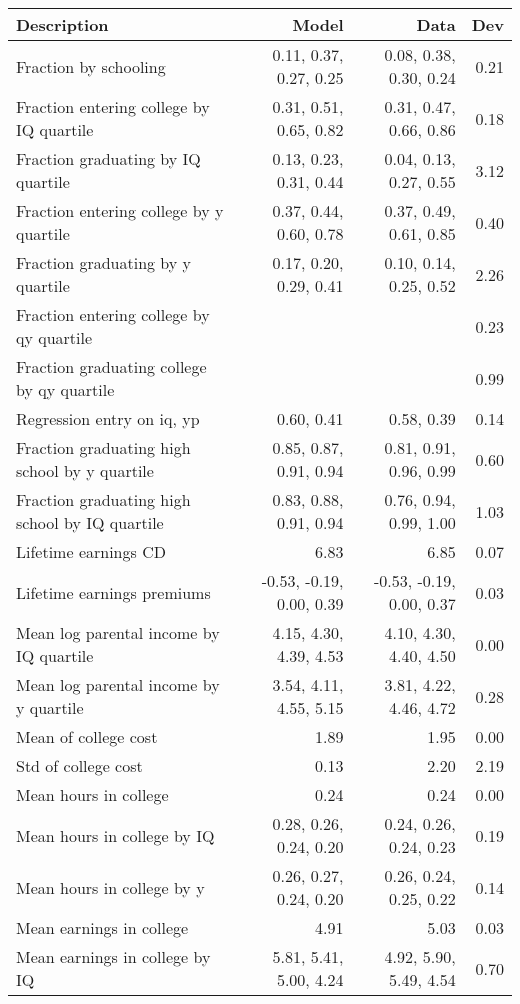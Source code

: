 \begin{tabular}{lrrr}
\hline
Description & Model  & Data  & Dev  \\ 
\hline
Fraction by schooling & 0.11, 0.37, 0.27, 0.25  & 0.08, 0.38, 0.30, 0.24  & 0.21  \\ 
Fraction entering college by IQ quartile & 0.31, 0.51, 0.65, 0.82  & 0.31, 0.47, 0.66, 0.86  & 0.18  \\ 
Fraction graduating by IQ quartile & 0.13, 0.23, 0.31, 0.44  & 0.04, 0.13, 0.27, 0.55  & 3.12  \\ 
Fraction entering college by y quartile & 0.37, 0.44, 0.60, 0.78  & 0.37, 0.49, 0.61, 0.85  & 0.40  \\ 
Fraction graduating by y quartile & 0.17, 0.20, 0.29, 0.41  & 0.10, 0.14, 0.25, 0.52  & 2.26  \\ 
Fraction entering college by qy quartile &   &   & 0.23  \\ 
Fraction graduating college by qy quartile &   &   & 0.99  \\ 
Regression entry on iq, yp & 0.60, 0.41  & 0.58, 0.39  & 0.14  \\ 
Fraction graduating high school by y quartile & 0.85, 0.87, 0.91, 0.94  & 0.81, 0.91, 0.96, 0.99  & 0.60  \\ 
Fraction graduating high school by IQ quartile & 0.83, 0.88, 0.91, 0.94  & 0.76, 0.94, 0.99, 1.00  & 1.03  \\ 
Lifetime earnings CD & 6.83  & 6.85  & 0.07  \\ 
Lifetime earnings premiums & -0.53, -0.19, 0.00, 0.39  & -0.53, -0.19, 0.00, 0.37  & 0.03  \\ 
Mean log parental income by IQ quartile & 4.15, 4.30, 4.39, 4.53  & 4.10, 4.30, 4.40, 4.50  & 0.00  \\ 
Mean log parental income by y quartile & 3.54, 4.11, 4.55, 5.15  & 3.81, 4.22, 4.46, 4.72  & 0.28  \\ 
Mean of college cost & 1.89  & 1.95  & 0.00  \\ 
Std of college cost & 0.13  & 2.20  & 2.19  \\ 
Mean hours in college & 0.24  & 0.24  & 0.00  \\ 
Mean hours in college by IQ & 0.28, 0.26, 0.24, 0.20  & 0.24, 0.26, 0.24, 0.23  & 0.19  \\ 
Mean hours in college by y & 0.26, 0.27, 0.24, 0.20  & 0.26, 0.24, 0.25, 0.22  & 0.14  \\ 
Mean earnings in college & 4.91  & 5.03  & 0.03  \\ 
Mean earnings in college by IQ & 5.81, 5.41, 5.00, 4.24  & 4.92, 5.90, 5.49, 4.54  & 0.70  \\ 

\end{tabular}
